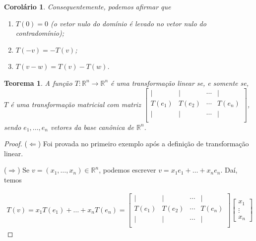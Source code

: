 \documentclass{article}
\newtheorem{theorem}{Teorema}[section]
\newtheorem{corollary}{Corolário}[theorem]
\begin{document}
\begin{corollary}
	Consequentemente, podemos afirmar que
	
	\begin{enumerate}
		\item $T(0) = 0$ (o vetor nulo do domínio é levado no vetor nulo do contradomínio);
		\item $T(-v) = -T(v)$;
		\item $T(v - w) = T(v) - T(w)$.
	\end{enumerate}
	
\end{corollary}

\begin{theorem}
	A função $T:\mathbb{R}^n\to\mathbb{R}^n$ é uma transformação linear se, e somente se, $T$ é uma transformação matricial com matriz $\begin{bmatrix}
	\vert & \vert & \cdots & \vert \\
	T(e_1) & T(e_2) & \cdots & T(e_n)\\
	\vert & \vert & \cdots & \vert \\
	\end{bmatrix}$, sendo $e_1, \dots, e_n$ vetores da base canônica de $\mathbb{R}^n$.
\end{theorem}

\begin{proof}
	($\Leftarrow$) Foi provada no primeiro exemplo após a definição de transformação linear.
	\par\vspace{0.3cm}\hspace{16pt}($\Rightarrow$) Se $v = (x_1, \dots, x_n)\in\mathbb{R}^n$, podemos escrever $v = x_1e_1 + \dots + x_ne_n$. Daí, temos
	
	\begin{align*}
	T(v) = x_1T(e_1) + \dots + x_nT(e_n) = \begin{bmatrix}
	\vert & \vert & \cdots & \vert \\
	T(e_1) & T(e_2) & \cdots & T(e_n)\\
	\vert & \vert & \cdots & \vert \\
	\end{bmatrix}\begin{bmatrix}
	x_1\\
	\vdots\\
	x_n
	\end{bmatrix}
	\end{align*}
	
	
\end{proof}
\end{document}
